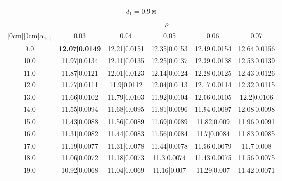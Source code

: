 \documentclass[20pt]{article}
\begin{document}
\begin{center}
\begin{tabular}{c|ccccc}
\hline
	\multicolumn{6}{c}{$d_{1}=0.9 \ м$} \\
\hline
	 & \multicolumn{5}{|c}{$\rho$} \\
	\cline{2-6}
	\raisebox{1.5ex}[0cm][0cm]{$\alpha_{1эф}$} & 0.03 & 0.04 & 0.05 & 0.06 & 0.07\\
\hline
	9.0 & 	\textbf{12.07|0.0149} & 	12.21|0.0151 & 	12.35|0.0153 & 	12.49|0.0154 & 	12.64|0.0156\\
	10.0 & 	11.97|0.0134 & 	12.11|0.0135 & 	12.25|0.0137 & 	12.39|0.0138 & 	12.53|0.0139\\
	11.0 & 	11.87|0.0121 & 	12.01|0.0123 & 	12.14|0.0124 & 	12.28|0.0125 & 	12.43|0.0126\\
	12.0 & 	11.77|0.0111 & 	11.9|0.0112 & 	12.04|0.0113 & 	12.17|0.0114 & 	12.32|0.0115\\
	13.0 & 	11.66|0.0102 & 	11.79|0.0103 & 	11.92|0.0104 & 	12.06|0.0105 & 	12.2|0.0106\\
	14.0 & 	11.55|0.0094 & 	11.68|0.0095 & 	11.81|0.0096 & 	11.94|0.0097 & 	12.08|0.0098\\
	15.0 & 	11.43|0.0088 & 	11.56|0.0089 & 	11.69|0.0089 & 	11.82|0.009 & 	11.96|0.0091\\
	16.0 & 	11.31|0.0082 & 	11.44|0.0083 & 	11.56|0.0084 & 	11.7|0.0084 & 	11.83|0.0085\\
	17.0 & 	11.19|0.0077 & 	11.31|0.0078 & 	11.44|0.0078 & 	11.56|0.0079 & 	11.7|0.008\\
	18.0 & 	11.06|0.0072 & 	11.18|0.0073 & 	11.3|0.0074 & 	11.43|0.0075 & 	11.56|0.0075\\
	19.0 & 	10.92|0.0068 & 	11.04|0.0069 & 	11.16|0.007 & 	11.29|0.007 & 	11.42|0.0071\\
\end{tabular}


\end{center}
\end{document}
